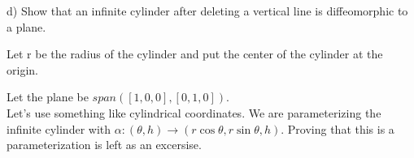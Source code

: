 \documentclass[10pt,letterpaper]{hmcpset}
\begin{document}
\newpage \begin{problem}
d) Show that an infinite cylinder after deleting a vertical line is 
diffeomorphic to a plane.
\end{problem}
\begin{solution}

Let r be the radius of the cylinder and put the center of the cylinder at the
origin.

Let the plane be $span([1, 0, 0], [0, 1, 0])$. \\
Let's use something like cylindrical coordinates. We are parameterizing the infinite
cylinder with $\alpha: (\theta, h) \rightarrow (r \cos \theta, r \sin \theta,h)$. Proving that this is a
parameterization is left as an excersise.  \\


\end{solution}
\end{document}
